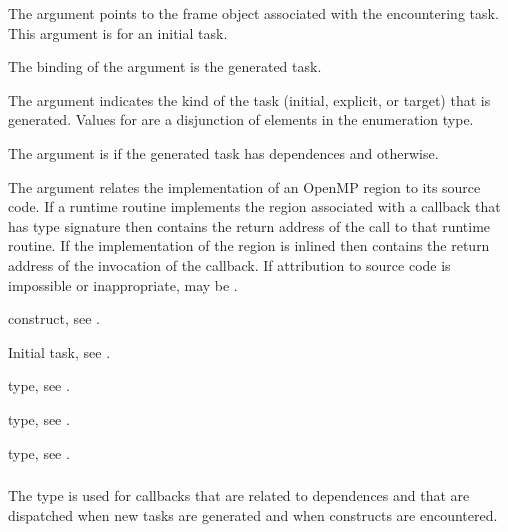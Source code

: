 The  argument points to the frame object
associated with the encountering task. This argument is  
for an initial task.

The binding of the  argument is the generated task.

The  argument indicates the kind of the task (initial, explicit, 
or target) that is generated. Values for  are a disjunction of 
elements in the  enumeration type.

The  argument is  if the generated task 
has dependences and  otherwise.

The  argument relates the implementation of an OpenMP region
to its source code. If a runtime routine implements the region associated with
a callback that has type signature  then
 contains the return address of the call to that runtime routine.
If the implementation of the region is inlined then  contains the
return address of the invocation of the callback. If attribution to source code
is impossible or inappropriate,  may be .

\begin{crossrefs}
\item {} construct, see .

\item Initial task, see .

\item {} type, see
.

\item {} type, see
.

\item {} type, see
.
\end{crossrefs}



\subsubsection{}
\label{sec:ompt_callback_dependences_t}

\summary
The  type is used for callbacks that are 
related to dependences and that are dispatched when new tasks are generated 
and when  constructs are encountered.

